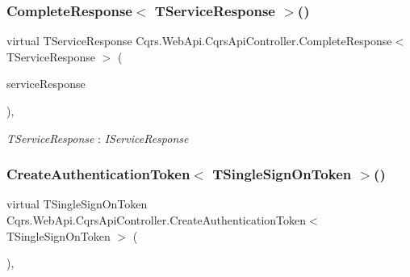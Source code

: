 \subsubsection{\texorpdfstring{Complete\+Response$<$ T\+Service\+Response $>$()}{CompleteResponse< TServiceResponse >()}}
{\footnotesize\ttfamily virtual T\+Service\+Response Cqrs.\+Web\+Api.\+Cqrs\+Api\+Controller.\+Complete\+Response$<$ T\+Service\+Response $>$ (\begin{DoxyParamCaption}\item[{T\+Service\+Response}]{service\+Response }\end{DoxyParamCaption})\hspace{0.3cm}{\ttfamily [protected]}, {\ttfamily [virtual]}}

\begin{Desc}
\item[Type Constraints]\begin{description}
\item[{\em T\+Service\+Response} : {\em I\+Service\+Response}]\end{description}
\end{Desc}
\mbox{\label{classCqrs_1_1WebApi_1_1CqrsApiController_af27a5ca72991c6fd2e50907cb032dd2b}} 
\subsubsection{\texorpdfstring{Create\+Authentication\+Token$<$ T\+Single\+Sign\+On\+Token $>$()}{CreateAuthenticationToken< TSingleSignOnToken >()}}
{\footnotesize\ttfamily virtual T\+Single\+Sign\+On\+Token Cqrs.\+Web\+Api.\+Cqrs\+Api\+Controller.\+Create\+Authentication\+Token$<$ T\+Single\+Sign\+On\+Token $>$ (\begin{DoxyParamCaption}{ }\end{DoxyParamCaption})\hspace{0.3cm}{\ttfamily [protected]}, {\ttfamily [virtual]}}


